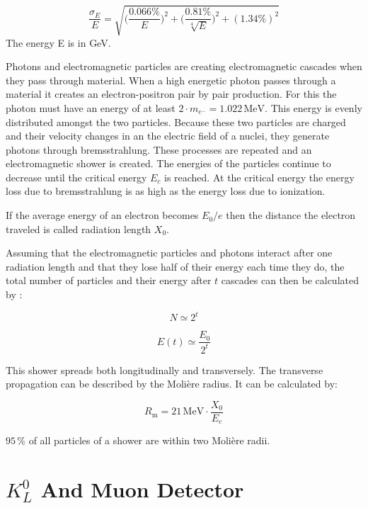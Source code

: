 \documentclass[a4paper,11pt,twosided,final,german,openbib,pdftex,listof=totoc,bibliography=totoc]{scrbook}
\begin{document}
\begin{equation}
\frac{\sigma_E}{E} = \sqrt{\bigg(\frac{0.066\%}{E}\bigg)^2 + \bigg(\frac{0.81\%}{\sqrt[4]{E}}\bigg)^2 + (1.34\%)^2}
\end{equation}
The energy E is in GeV.
\newline

Photons and electromagnetic particles are creating electromagnetic cascades when they pass through material.\cite{leo2012techniques} When a high energetic photon passes through a material it creates an electron-positron pair by pair production. For this the photon must have an energy of at least $2\cdot m_{e^{-}} = 1.022\,\textrm{MeV}$. This energy is evenly distributed amongst the two particles. Because these two particles are charged and their velocity changes in an the electric field of a nuclei, they generate photons through bremsstrahlung. These processes are repeated and an electromagnetic shower is created. The energies of the particles continue to decrease until the critical energy $E_c$ is reached. At the critical energy the energy loss due to bremsstrahlung is as high as the energy loss due to ionization.

If the average energy of an electron becomes ${E_0}/{e}$ then the distance the electron traveled is called radiation length $X_0$.

Assuming that the electromagnetic particles and photons interact after one radiation length and that they lose half of their energy each time they do, the total number of particles and their energy after $t$ cascades can then be calculated by \cite{leo2012techniques}:

\begin{equation}
	N \simeq 2^t
\end{equation}

\begin{equation}
	E(t) \simeq \frac{E_0}{2^t}
\end{equation}

This shower spreads both longitudinally and transversely. The transverse propagation can be described by the Moli\`ere radius. It can be calculated by:

\begin{equation}
	R_{\textrm{m}}=21\,\textrm{MeV}\cdot \frac{X_0}{E_c}
\end{equation}

$ 95\,\%$ of all particles of a shower are within two Moli\`ere radii.\cite{leo2012techniques}

\section{$K_L^0$ And Muon Detector }
\label{sec:KM}
\end{document}
